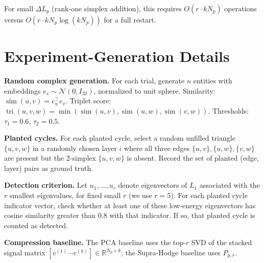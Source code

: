 \documentclass[11pt]{article}
\theoremstyle{definition}
\theoremstyle{remark}
\newcommand{\R}{\mathbb{R}}
\newcommand{\Pp}{P_{p,r}}
\DeclareMathOperator{\simop}{sim}
\DeclareMathOperator{\tri}{tri}
\begin{document}
For small $\Delta L_p$ (rank-one simplex addition), this requires $O(r\cdot kN_p)$
operations versus $O(r\cdot kN_p\log(kN_p))$ for a full restart.

\clearpage
\section{Experiment-Generation Details}
\label{app:experiments}

\textbf{Random complex generation.} For each trial, generate $n$ entities with
embeddings $e_v\sim\mathcal{N}(0,I_{32})$, normalized to unit sphere.
Similarity: $\simop(u,v)=e_u^\top e_v$. Triplet score:
$\tri(u,v,w)=\min(\simop(u,v),\simop(u,w),\simop(v,w))$. Thresholds:
$\tau_1=0.6$, $\tau_2=0.5$.

\textbf{Planted cycles.} For each planted cycle, select a random unfilled
triangle $\{u,v,w\}$ in a randomly chosen layer $i$ where all three edges
$\{u,v\},\{u,w\},\{v,w\}$ are present but the 2-simplex $\{u,v,w\}$ is absent.
Record the set of planted (edge, layer) pairs as ground truth.

\textbf{Detection criterion.} Let $u_1,\dots,u_r$ denote eigenvectors of $L_1$
associated with the $r$ smallest eigenvalues, for fixed small $r$ (we use $r=5$).
For each planted cycle indicator vector, check whether at least one of these
low-energy eigenvectors has cosine similarity greater than $0.8$ with that
indicator. If so, that planted cycle is counted as detected.

\textbf{Compression baseline.} The PCA baseline uses the top-$r$ SVD of the
stacked signal matrix $[v^{(1)}\cdots v^{(k)}]\in\R^{N_p\times k}$; the
Supra-Hodge baseline uses $\Pp$.
\end{document}
